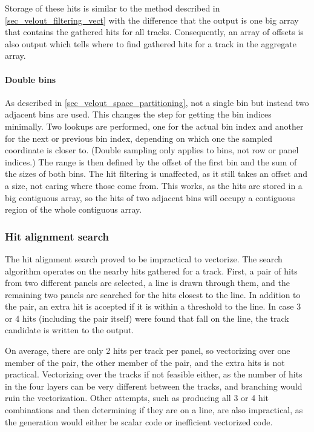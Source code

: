 \documentclass[12pt]{article}
\begin{document}
Storage of these hits is similar to the method described in \ref{sec_velout_filtering_vect} with the difference that the output is one big array that contains the gathered hits for all tracks. Consequently, an array of offsets is also output which tells where to find gathered hits for a track in the aggregate array.

\paragraph{Double bins}\mbox{}\vspace{0.4pc}

As described in \ref{sec_velout_space_partitioning}, not a single bin but instead two adjacent bins are used. This changes the step for getting the bin indices minimally. Two lookups are performed, one for the actual bin index and another for the next or previous bin index, depending on which one the sampled coordinate is closer to. (Double sampling only applies to bins, not row or panel indices.) The range is then defined by the offset of the first bin and the sum of the sizes of both bins. The hit filtering is unaffected, as it still takes an offset and a size, not caring where those come from. This works, as the hits are stored in a big contiguous array, so the hits of two adjacent bins will occupy a contiguous region of the whole contiguous array.


\subsubsection{Hit alignment search}

The hit alignment search proved to be impractical to vectorize. The search algorithm operates on the nearby hits gathered for a track. First, a pair of hits from two different panels are selected, a line is drawn through them, and the remaining two panels are searched for the hits closest to the line. In addition to the pair, an extra hit is accepted if it is within a threshold to the line. In case 3 or 4 hits (including the pair itself) were found that fall on the line, the track candidate is written to the output.

On average, there are only 2 hits per track per panel, so vectorizing over one member of the pair, the other member of the pair, and the extra hits is not practical. Vectorizing over the tracks if not feasible either, as the number of hits in the four layers can be very different between the tracks, and branching would ruin the vectorization. Other attempts, such as producing all 3 or 4 hit combinations and then determining if they are on a line, are also impractical, as the generation would either be scalar code or inefficient vectorized code.
\end{document}
